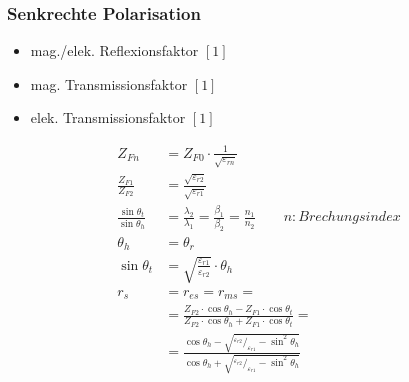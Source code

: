 

\subsubsection{Senkrechte Polarisation}


\begin{itemize}
    \item mag./elek. Reflexionsfaktor $[1]$
    \item mag. Transmissionsfaktor $[1]$
    \item elek. Transmissionsfaktor $[1]$
\end{itemize}

\begin{align*}
    Z_{Fn}                            & = Z_{F0}\cdot\frac{1}{\sqrt{\varepsilon_{rn}}}                                                                                                                  \\
    \frac{Z_{F1}}{Z_{F2}}             & = \frac{\sqrt{\varepsilon_{r2}}}{\sqrt{\varepsilon_{r1}}}                                                                                                       \\
    \frac{\sin\theta_t}{\sin\theta_h} & = \frac{\lambda_2}{\lambda_1}= \frac{\beta_1}{\beta_2}= \frac{n_1}{n_2} \qquad n: Brechungsindex                                                                \\
    \theta_h                          & = \theta_r                                                                                                                                                      \\
    \sin\theta_t                      & = \sqrt{\frac{\varepsilon_{r1}}{\varepsilon_{r2}}}\cdot\theta_h                                                                                                 \\
    r_s                               & =  r_{e s} = r_{m s} =                                                                                                                                          \\
                                      & = \frac{Z_{F 2} \cdot \cos \theta_h-Z_{F 1} \cdot \cos \theta_t}{Z_{F 2} \cdot \cos \theta_h+Z_{F 1} \cdot \cos \theta_t} =                                     \\
                                      & = \frac{\cos\theta_h-\sqrt{^{\varepsilon_{r2}}/_{\varepsilon_{r1}}-\sin^2\theta_h}}{\cos\theta_h+\sqrt{^{\varepsilon_{r2}}/_{\varepsilon_{r1}}-\sin^2\theta_h}} \\

\end{align*}
